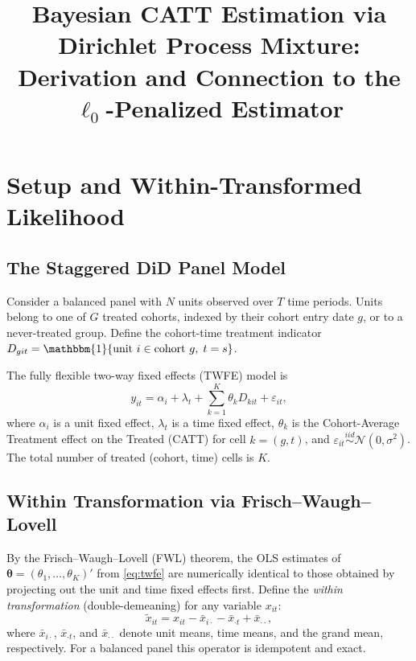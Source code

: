 \documentclass[12pt]{article}
\title{Bayesian CATT Estimation via Dirichlet Process Mixture:\\
\large Derivation and Connection to the $\ell_0$-Penalized Estimator}
\author{}
\date{}
\newcommand{\Normal}{\mathcal{N}}
\newcommand{\1}{\mathbbm{1}}
\begin{document}
\maketitle
\tableofcontents
\newpage

\section{Setup and Within-Transformed Likelihood}

\subsection{The Staggered DiD Panel Model}

Consider a balanced panel with $N$ units observed over $T$ time periods. Units
belong to one of $G$ treated cohorts, indexed by their cohort entry date $g$,
or to a never-treated group. Define the cohort-time treatment indicator
$D_{git} = \1\{\text{unit }i\in\text{cohort }g,\; t=s\}$.

The fully flexible two-way fixed effects (TWFE) model is
\begin{equation}
  y_{it} = \alpha_i + \lambda_t + \sum_{k=1}^{K}\theta_k D_{kit} + \varepsilon_{it},
  \label{eq:twfe}
\end{equation}
where $\alpha_i$ is a unit fixed effect, $\lambda_t$ is a time fixed effect,
$\theta_k$ is the Cohort-Average Treatment effect on the Treated (CATT) for
cell $k = (g,t)$, and $\varepsilon_{it}\overset{iid}{\sim}\Normal(0,\sigma^2)$.
The total number of treated (cohort, time) cells is $K$.

\subsection{Within Transformation via Frisch--Waugh--Lovell}

By the Frisch--Waugh--Lovell (FWL) theorem, the OLS estimates of
$\bm{\theta} = (\theta_1,\ldots,\theta_K)'$ from \eqref{eq:twfe} are
numerically identical to those obtained by projecting out the unit and time
fixed effects first. Define the \emph{within transformation} (double-demeaning)
for any variable $x_{it}$:
\begin{equation}
  \tilde{x}_{it} = x_{it} - \bar{x}_{i\cdot} - \bar{x}_{\cdot t} + \bar{x}_{\cdot\cdot},
\end{equation}
where $\bar{x}_{i\cdot}$, $\bar{x}_{\cdot t}$, and $\bar{x}_{\cdot\cdot}$
denote unit means, time means, and the grand mean, respectively. For a balanced
panel this operator is idempotent and exact.
\end{document}
